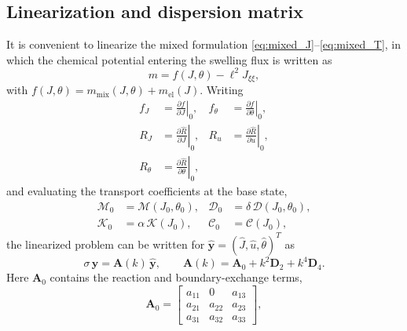 \documentclass[aps,pre,reprint,superscriptaddress,longbibliography,floatfix]{revtex4-2}
\newcommand{\Ms}{\mathcal{M}}
\newcommand{\Ds}{\mathcal{D}}
\newcommand{\Cs}{\mathcal{C}}
\newcommand{\Ks}{\mathcal{K}}
\newcommand{\Rhat}{\widehat{R}}
\begin{document}
\subsection{Linearization and dispersion matrix}

It is convenient to linearize the mixed formulation
\eqref{eq:mixed_J}--\eqref{eq:mixed_T}, in which the chemical potential
entering the swelling flux is written as
\begin{equation}
  m = f(J,\theta) - \ell^2 J_{\xi\xi},
\end{equation}
with $f(J,\theta)=m_\mathrm{mix}(J,\theta)+m_\mathrm{el}(J)$. Writing
\begin{subequations}
\begin{align}
  f_J &= \left.\frac{\partial f}{\partial J}\right|_0, &
  f_\theta &= \left.\frac{\partial f}{\partial \theta}\right|_0,
  \\
  R_J &= \left.\frac{\partial \Rhat}{\partial J}\right|_0, &
  R_u &= \left.\frac{\partial \Rhat}{\partial u}\right|_0,
  \\
  R_\theta &= \left.\frac{\partial \Rhat}{\partial \theta}\right|_0,
\end{align}
\end{subequations}
and evaluating the transport coefficients at the base state,
\begin{subequations}
\begin{align}
  \Ms_0 &= \Ms(J_0,\theta_0), &
  \Ds_0 &= \delta\,\Ds(J_0,\theta_0),
  \\
  \Ks_0 &= \alpha\,\Ks(J_0), &
  \Cs_0 &= \Cs(J_0),
\end{align}
\end{subequations}
the linearized problem can be written for
$\widehat{\mathbf y}=(\widehat J,\widehat u,\widehat\theta)^T$ as
\begin{equation}
  \sigma\,\widehat{\mathbf y} = \mathbf A(k)\,\widehat{\mathbf y},
  \qquad
  \mathbf A(k)=\mathbf A_0 + k^2\mathbf D_2 + k^4\mathbf D_4.
  \label{eq:dispersion_matrix}
\end{equation}
Here $\mathbf A_0$ contains the reaction and boundary-exchange terms,
\begin{equation}
  \mathbf A_0 =
  \begin{bmatrix}
    a_{11} & 0 & a_{13} \\
    a_{21} & a_{22} & a_{23} \\
    a_{31} & a_{32} & a_{33}
  \end{bmatrix},
  \label{eq:A0}
\end{equation}
\end{document}
